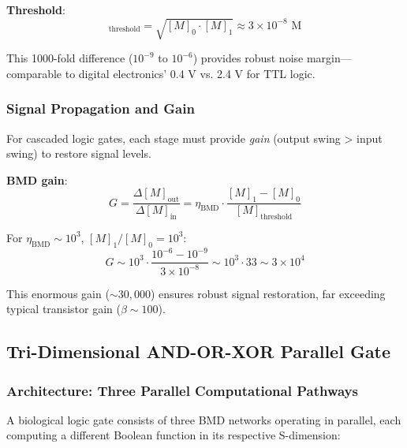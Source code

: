 \documentclass[11pt,a4paper]{article}
\begin{document}
\textbf{Threshold}:
\begin{equation}
[M]_{\text{threshold}} = \sqrt{[M]_0 \cdot [M]_1} \approx 3 \times 10^{-8} \text{ M}
\end{equation}

This 1000-fold difference ($10^{-9}$ to $10^{-6}$) provides robust noise margin—comparable to digital electronics' 0.4 V vs. 2.4 V for TTL logic.

\subsubsection{Signal Propagation and Gain}

For cascaded logic gates, each stage must provide \textit{gain} (output swing > input swing) to restore signal levels\cite{mead1989analog}.

\textbf{BMD gain}:
\begin{equation}
G = \frac{\Delta [M]_{\text{out}}}{\Delta [M]_{\text{in}}} = \eta_{\text{BMD}} \cdot \frac{[M]_1 - [M]_0}{[M]_{\text{threshold}}}
\end{equation}

For $\eta_{\text{BMD}} \sim 10^3$, $[M]_1/[M]_0 = 10^3$:
\begin{equation}
G \sim 10^3 \cdot \frac{10^{-6} - 10^{-9}}{3 \times 10^{-8}} \sim 10^3 \cdot 33 \sim 3 \times 10^4
\end{equation}

This enormous gain ($\sim 30,000$) ensures robust signal restoration, far exceeding typical transistor gain ($\beta \sim 100$).

\subsection{Tri-Dimensional AND-OR-XOR Parallel Gate}

\subsubsection{Architecture: Three Parallel Computational Pathways}

A biological logic gate consists of three BMD networks operating in parallel, each computing a different Boolean function in its respective S-dimension:
\end{document}
